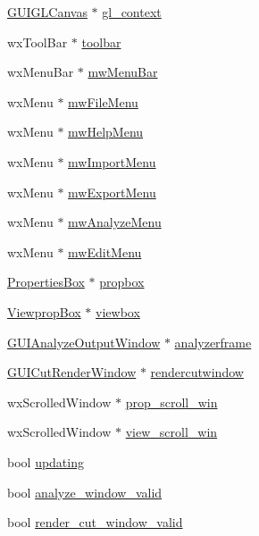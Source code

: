\begin{DoxyCompactItemize}
\item 
\hyperlink{classGUIGLCanvas}{G\-U\-I\-G\-L\-Canvas} $\ast$ \hyperlink{classGUIMainWindow_a7b5069afb8996ff001654f8d832b2bfa}{gl\-\_\-context}
\item 
wx\-Tool\-Bar $\ast$ \hyperlink{classGUIMainWindow_a8a8638fa87b4080e2242812f3d7e469e}{toolbar}
\item 
wx\-Menu\-Bar $\ast$ \hyperlink{classGUIMainWindow_a057a6728bf9aa994f41060ebe15a28ac}{mw\-Menu\-Bar}
\item 
wx\-Menu $\ast$ \hyperlink{classGUIMainWindow_a3b23fa0fb1d779bd5b8384507d8b90e8}{mw\-File\-Menu}
\item 
wx\-Menu $\ast$ \hyperlink{classGUIMainWindow_ae8fc1a9ba3768aa042a77b5bea117f6c}{mw\-Help\-Menu}
\item 
wx\-Menu $\ast$ \hyperlink{classGUIMainWindow_afaff9e1bec11b0f80215ceba76e87bc4}{mw\-Import\-Menu}
\item 
wx\-Menu $\ast$ \hyperlink{classGUIMainWindow_a9f6af05ef18bf81ff9955670001941ea}{mw\-Export\-Menu}
\item 
wx\-Menu $\ast$ \hyperlink{classGUIMainWindow_ab93a87b5cde10015dc02dc000c409f90}{mw\-Analyze\-Menu}
\item 
wx\-Menu $\ast$ \hyperlink{classGUIMainWindow_a32c50be8574176c02aadb47626adc9d4}{mw\-Edit\-Menu}
\item 
\hyperlink{classPropertiesBox}{Properties\-Box} $\ast$ \hyperlink{classGUIMainWindow_a4959774563543927a492bf06e441920e}{propbox}
\item 
\hyperlink{classViewpropBox}{Viewprop\-Box} $\ast$ \hyperlink{classGUIMainWindow_a3e9a4e301f90e85e97721aa71b197ca8}{viewbox}
\item 
\hyperlink{classGUIAnalyzeOutputWindow}{G\-U\-I\-Analyze\-Output\-Window} $\ast$ \hyperlink{classGUIMainWindow_a20e7a8cf498df1c1c0059711b487837b}{analyzerframe}
\item 
\hyperlink{classGUICutRenderWindow}{G\-U\-I\-Cut\-Render\-Window} $\ast$ \hyperlink{classGUIMainWindow_a649cb92f27688772174659601188ac2d}{rendercutwindow}
\item 
wx\-Scrolled\-Window $\ast$ \hyperlink{classGUIMainWindow_a1c120efb232cf3d371a3a6231619b808}{prop\-\_\-scroll\-\_\-win}
\item 
wx\-Scrolled\-Window $\ast$ \hyperlink{classGUIMainWindow_ad440f7451fd3fdabbe48518a89e61e45}{view\-\_\-scroll\-\_\-win}
\item 
bool \hyperlink{classGUIMainWindow_afdc35b04c0fe94e4d0080f659ecbce8c}{updating}
\item 
bool \hyperlink{classGUIMainWindow_a1f65a053fadac47033fef38c4b0e8a69}{analyze\-\_\-window\-\_\-valid}
\item 
bool \hyperlink{classGUIMainWindow_a4f08d8e4294955a3cc0b071dd3cad0d2}{render\-\_\-cut\-\_\-window\-\_\-valid}
\end{DoxyCompactItemize}


